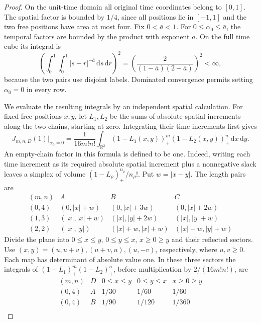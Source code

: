 \documentclass[12pt]{article}
\numberwithin{equation}{section}
\theoremstyle{definition}
\newcommand{\R}{\mathbb{R}}
\newcommand{\ud}{\,\mathrm{d}}
\begin{document}
\begin{proof}
  On the unit-time domain all original time coordinates belong to
  $[0,1]$. The spatial factor is bounded by $1/4$, since all positions
  lie in $[-1,1]$ and the two free positions have area at most four.
  Fix $0<\bar a<1$. For $0\le\alpha_0\le\bar a$, the temporal
  factors are bounded by the product with exponent $\bar a$.
  On the full time cube its integral is
  \[
    \left(\int_0^1\int_0^1|s-r|^{-\bar a}\ud s\ud r\right)^2
    =\left(\frac{2}{(1-\bar a)(2-\bar a)}\right)^2<\infty,
  \]
  because the two pairs use disjoint labels. Dominated convergence
  permits setting $\alpha_0=0$ in every row.

  We evaluate the resulting integrals by an independent spatial
  calculation. For fixed free positions $x,y$, let $L_1,L_2$ be the
  sums of absolute spatial increments along the two chains, starting
  at zero. Integrating their time increments first gives
  \begin{equation}\label{E:static-sector}
    J_{m,n,D}(1)\big|_{\alpha_0=0}
    =\frac{1}{16m!n!}\int_{\R^2}
    (1-L_1(x,y))_+^m(1-L_2(x,y))_+^n\ud x\ud y.
  \end{equation}
  An empty-chain factor in this formula is defined to be one. Indeed,
  writing each time increment as its required absolute spatial increment
  plus a nonnegative slack leaves a simplex of volume
  $(1-L_\rho)_+^{n_\rho}/n_\rho!$.
  Put $w=|x-y|$. The length pairs are
  \[
    \begin{array}{c|ccc}
      (m,n)&A&B&C\\ \hline
      (0,4)&(0,|x|+w)&(0,|x|+3w)&(0,|x|+2w)\\
      (1,3)&(|x|,|x|+w)&(|x|,|y|+2w)&(|x|,|y|+w)\\
      (2,2)&(|x|,|y|)&(|x|+w,|x|+w)&(|x|+w,|y|+w)
    \end{array}
  \]
  Divide the plane into $0\le x\le y$, $0\le y\le x$, $x\ge0\ge y$
  and their reflected sectors. Use $(x,y)=(u,u+v),(u+v,u),(u,-v)$,
  respectively, where $u,v\ge0$. Each map has determinant of absolute
  value one. In these three sectors the integrals of
  $(1-L_1)_+^m(1-L_2)_+^n$, before multiplication by $2/(16m!n!)$, are
  \begin{equation}\label{E:sector-values}
    \begin{array}{c|c|ccc}
      (m,n)&D&0\le x\le y&0\le y\le x&x\ge0\ge y\\ \hline
      (0,4)&A&1/30&1/60&1/60\\
      (0,4)&B&1/90&1/120&1/360\\

\end{array}
\end{equation}
\end{proof}
\end{document}
